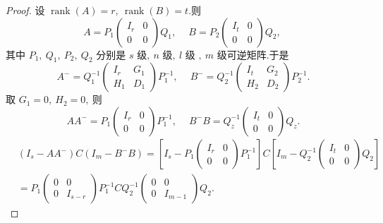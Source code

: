 \begin{proof}
	设  $\operatorname{rank}(A)=r,\  \operatorname{rank}(B)=t . $则
	$$A=P_{1}\left(\begin{array}{ll}
		I_{r} & 0 \\
		0 & 0
	\end{array}\right) Q_{1},\  \quad B=P_{2}\left(\begin{array}{ll}
		I_{t} & 0 \\
		0 & 0
	\end{array}\right) Q_{2},\ $$
	其中 $ P_{1} ,\  Q_{1} ,\  P_{2} ,\  Q_{2} $ 分别是  $s $ 级$,\  n$  级$,\   l$  级  $,\ m$  级可逆矩阵.于是
	$$A^{-}=Q_{1}^{-1}\left(\begin{array}{ll}
		I_{r} & G_{1} \\
		H_{1} & D_{1}
	\end{array}\right) P_{1}^{-1},\  \quad B^{-}=Q_{2}^{-1}\left(\begin{array}{cc}
		I_{t} & G_{2} \\
		H_{2} & D_{2}
	\end{array}\right) P_{2}^{-1} .$$
	取 $ G_{1}=0,\  H_{2}=0 ,\ $则
	$$A A^{-}=P_{1}\left(\begin{array}{cc}
		I_{r} & 0 \\
		0 & 0
	\end{array}\right) P_{1}^{-1},\  \quad B^{-} B=Q_{z}^{-1}\left(\begin{array}{ll}
		I_{t} & 0 \\
		0 & 0
	\end{array}\right) Q_{z} .$$
	$$\begin{aligned}
		&\left(I_{s}-A A^{-}\right) C\left(I_{m}-B^{-} B\right)=\left[I_{s}-P_{1}\left(\begin{array}{cc}
			I_{r} & 0 \\
			0 & 0
		\end{array}\right) P_{1}^{-1}\right] C\left[I_{m}-Q_{2}^{-1}\left(\begin{array}{cc}
			I_{t} & 0 \\
			0 & 0
		\end{array}\right) Q_{2}\right] \\
		&=P_{1}\left(\begin{array}{cc}
			0 & 0 \\
			0 & I_{s-r}
		\end{array}\right) P_{1}^{-1} C Q_{2}^{-1}\left(\begin{array}{cc}
			0 & 0 \\
			0 & I_{m-1}
		\end{array}\right) Q_{2} .

\end{aligned}$$
\end{proof}
